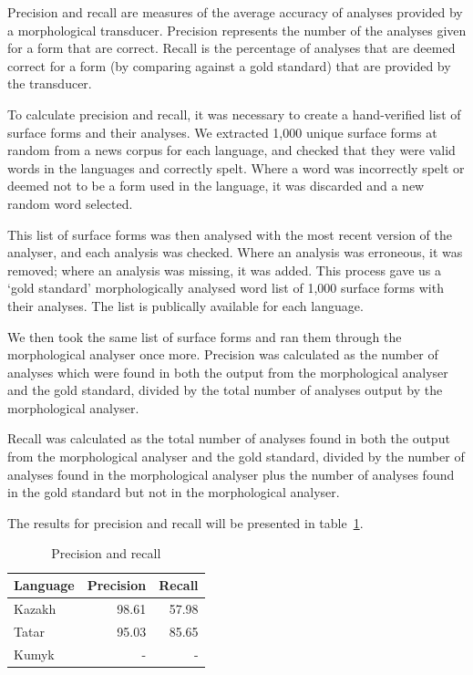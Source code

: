 \documentclass[a4paper,11pt,twocolumn]{article}
\begin{document}
Precision and recall are measures of the average accuracy of analyses provided by a morphological transducer.  Precision represents the number of the analyses given for a form that are correct.  Recall is the percentage of analyses that are deemed correct for a form (by comparing against a gold standard) that are provided by the transducer.

To calculate precision and recall, it was necessary to create a hand-verified list of surface forms and their analyses.  We extracted 1,000 unique surface forms at random from a news corpus for each language, and checked that they were valid words in the languages and correctly spelt.  Where a word was incorrectly spelt or deemed not to be a form used in the language, it was discarded and a new random word selected.

This list of surface forms was then analysed with the most recent version of the analyser, and each analysis was checked.  Where an analysis was erroneous, it was removed; where an analysis was missing, it was added.  This process gave us a `gold standard' morphologically analysed word list of 1,000 surface forms with their analyses.  The list is publically available for each language.%

We then took the same list of surface forms and ran them through the morphological analyser once more.  Precision was calculated as the number of analyses which were found in both the output from the morphological analyser and the gold standard, divided by the total number of analyses output by the morphological analyser.

Recall was calculated as the total number of analyses found in both the output from the morphological analyser and the gold standard, divided by the number of analyses found in the morphological analyser plus the number of analyses found in the gold standard but not in the morphological analyser.

The results for precision and recall will be presented in table~\ref{table:precrecall}.



\begin{table}
\begin{center}
	\begin{tabular}{lrr}
	\toprule
		\textbf{Language} & \textbf{Precision} & \textbf{Recall} \\
	\midrule
		Kazakh & 98.61 &  57.98 \\
		Tatar & 95.03 & 85.65 \\
		Kumyk & - & - \\
	\bottomrule
	\end{tabular}
	\caption{Precision and recall}
	\label{table:precrecall}
\end{center}
\end{table}
\end{document}
